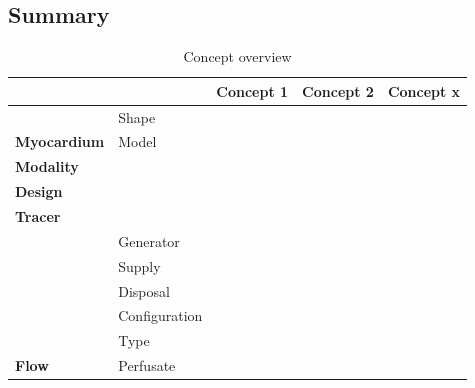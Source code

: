 \subsection{Summary}
\begin{table}[H]
\caption{Concept overview}
\begin{tabular}{l|llll}
\textbf{}                                                  &                               & \multicolumn{1}{c}{Concept 1} & Concept 2                & Concept x                                     \\ \hline
\multicolumn{1}{c|}{}                                      & \cellcolor{red}Shape &\cellcolor{red}      & \cellcolor{red} & \multicolumn{1}{l|}{\cellcolor{red}} \\
\multicolumn{1}{c|}{\multirow{-2}{*}{\textbf{Myocardium}}} & Model                         &                               &                          & \multicolumn{1}{l|}{}                         \\
\textbf{Modality}                                          & \cellcolor{red}      & \cellcolor{red}      & \cellcolor{red} & \multicolumn{1}{l|}{\cellcolor{red}} \\
\textbf{Design}                                            &                               &                               &                          & \multicolumn{1}{l|}{}                         \\
\textbf{Tracer}                                            & \cellcolor{red}      & \cellcolor{red}      & \cellcolor{red} & \multicolumn{1}{l|}{\cellcolor{red}} \\
                                                           & Generator                     &                               &                          & \multicolumn{1}{l|}{}                         \\
                                                           & Supply                        &                               &                          & \multicolumn{1}{l|}{}                         \\
                                                           & Disposal                      &                               &                          & \multicolumn{1}{l|}{}                         \\
                                                           & Configuration                 &                               &                          & \multicolumn{1}{l|}{}                         \\
                                                           & \cellcolor{red}Type  & \cellcolor{red}      & \cellcolor{red} & \multicolumn{1}{l|}{\cellcolor{red}} \\
\multirow{-6}{*}{\textbf{Flow}}                            & Perfusate                     &                               &                          & \multicolumn{1}{l|}{}                         \\ \cline{2-5} 
\end{tabular}
\end{table}
